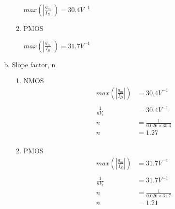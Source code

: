 \documentclass{article}
\begin{document}
\begin{enumerate}[(a)]
\begin{enumerate}[1.]
\(max(|\frac{g_{m}}{I_{D}}|) = 30.4 V^{-1}\)
\item PMOS

\(max(|\frac{g_{m}}{I_{S}}|) = 31.7 V^{-1}\)
\end{enumerate}
\item Slope factor, n
\begin{enumerate}[1.]
\item NMOS
\begin{equation*}
\begin{aligned}
max(|\frac{g_{m}}{I_{D}}|) &= 30.4 V^{-1}\\\\
\frac{1}{nV_{t}} &= 30.4 V^{-1}\\
n &= \frac{1}{0.026 \times 30.4}\\
n &= 1.27 \\
\end{aligned}
\end{equation*}
\item PMOS
\begin{equation*}
\begin{aligned}
max(|\frac{g_{m}}{I_{S}}|) &= 31.7 V^{-1}\\\\
\frac{1}{nV_{t}} &= 31.7 V^{-1}\\
n &= \frac{1}{0.026 \times 31.7}\\
n &= 1.21 \\
\end{aligned}
\end{equation*}
\end{enumerate}
\end{enumerate}
\end{document}
